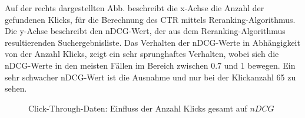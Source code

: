 \begin{minipage}{0.40\linewidth}
Auf der rechts dargestellten Abb. beschreibt die x-Achse die Anzahl der gefundenen Klicks, für die Berechnung des CTR mittels Reranking-Algorithmus. Die y-Achse beschreibt den nDCG-Wert, der aus dem Reranking-Algorithmus resultierenden Suchergebnisliste. Das Verhalten der nDCG-Werte in Abhängigkeit von der Anzahl Klicks, zeigt ein sehr sprunghaftes Verhalten, wobei sich die nDCG-Werte in den meisten Fällen im Bereich zwischen 0.7 und 1 bewegen. Ein sehr schwacher nDCG-Wert ist die Ausnahme und nur bei der Klickanzahl 65 zu sehen.
\end{minipage}
\hfill
\begin{minipage}{0.55\linewidth}
\begin{figure}[H]
\centering 
\vspace{-1.5em}
\caption[Click-Through-Daten: Einfluss der Anzahl Klicks gesamt auf $nDCG$]{Click-Through-Daten: Einfluss der Anzahl Klicks gesamt auf $nDCG$}
\label{fig:Evaluation:Auswertung:ClicksNDCG}

\footnotesize
{}\clicks
\pgfsetplotmarksize{.5pt}
  

\vspace{-2em}
\end{figure}
\end{minipage}


